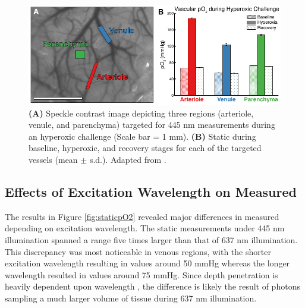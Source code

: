 \begin{figure}
    \includegraphics{figures/chapter_2/hyperoxicchallenge.pdf}
    \caption[\textbf{(A)} Speckle contrast image depicting three regions (arteriole, venule, and parenchyma) targeted for 445 nm  measurements during an hyperoxic challenge (Scale bar = 1 mm). \textbf{(B)} Static  during baseline, hyperoxic, and recovery stages for each of the targeted vessels (mean $\pm$ s.d.).]{
        \label{fig:hyperoxicchallenge}
        \textbf{(A)} Speckle contrast image depicting three regions (arteriole, venule, and parenchyma) targeted for 445 nm  measurements during an hyperoxic challenge (Scale bar = 1 mm). \textbf{(B)} Static  during baseline, hyperoxic, and recovery stages for each of the targeted vessels (mean $\pm$ s.d.). Adapted from \cite{Sullender:2018ff}.
    }
\end{figure}

\subsection{Effects of Excitation Wavelength on Measured }

The results in Figure \ref{fig:staticpO2} revealed major differences in measured  depending on excitation wavelength. The static  measurements under 445 nm illumination spanned a range five times larger than that of 637 nm illumination. This discrepancy was most noticeable in venous regions, with the shorter excitation wavelength resulting in  values around 50 mmHg whereas the longer wavelength resulted in values around 75 mmHg. Since depth penetration is heavily dependent upon wavelength \cite{Deng:2003kb}, the difference is likely the result of photons sampling a much larger volume of tissue during 637 nm illumination.

